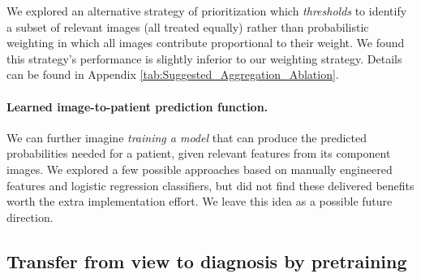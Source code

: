 We explored an alternative strategy of prioritization which \emph{thresholds} to identify a subset of relevant images (all treated equally) rather than probabilistic weighting in which all images contribute proportional to their weight. We found this strategy's performance is slightly inferior to our weighting strategy. Details can be found in Appendix \ref{tab:Suggested_Aggregation_Ablation}.

\paragraph{Learned image-to-patient prediction function.} 
We can further imagine \emph{training a model} that can produce the predicted probabilities needed for a patient, given relevant features from its component images.
We explored a few possible approaches based on manually engineered features and logistic regression classifiers, but did not find these delivered benefits worth the extra implementation effort. We leave this idea as a possible future direction.




\subsection{Transfer from view to diagnosis by pretraining}
\label{sec:transfer_from_view_to_diagnosis}

